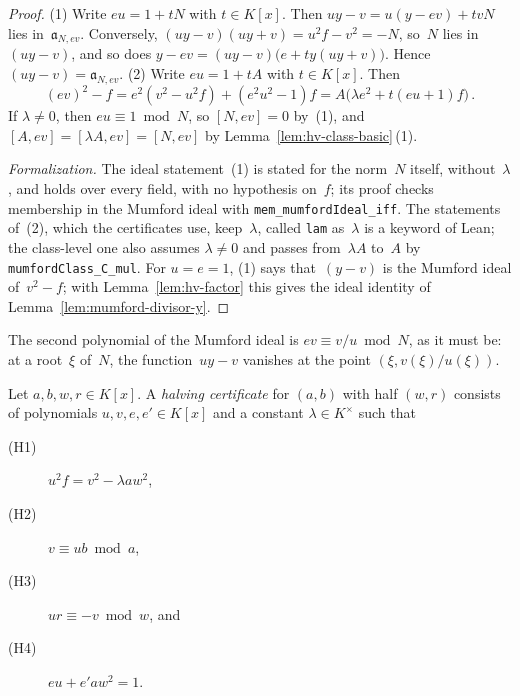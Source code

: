 \begin{proof}
\leanok
{}
(1) Write $eu = 1 + tN$ with $t \in K[x]$. Then $uy - v = u (y - ev) + tvN$ lies
in~$\mathfrak a_{N, ev}$. Conversely, $(uy - v)(uy + v) = u^2 f - v^2 = -N$, so~$N$ lies
in~$(uy - v)$, and so does $y - ev = (uy - v)\bigl(e + ty(uy + v)\bigr)$. Hence
$(uy - v) = \mathfrak a_{N, ev}$.
(2) Write $eu = 1 + tA$ with $t \in K[x]$. Then
\[ (ev)^2 - f = e^2 (v^2 - u^2 f) + (e^2 u^2 - 1) f
               = A\bigl(\lambda e^2 + t (eu + 1) f\bigr)\,. \]
If $\lambda \ne 0$, then $eu \equiv 1 \bmod N$, so $[N, ev] = 0$ by~(1), and
$[A, ev] = [\lambda A, ev] = [N, ev]$ by Lemma~\ref{lem:hv-class-basic}\,(1).

\emph{Formalization.} The ideal statement~(1) is stated for the norm~$N$ itself,
without~$\lambda$, and holds over every field, with no hypothesis on~$f$; its proof checks
membership in the Mumford ideal with \texttt{mem\_mumfordIdeal\_iff}. The statements of~(2), which
the certificates use, keep~$\lambda$, called \texttt{lam} as~$\lambda$ is a keyword of Lean; the
class-level one also assumes $\lambda \ne 0$ and passes from~$\lambda A$ to~$A$ by
\texttt{mumfordClass\_C\_mul}. For $u = e = 1$, (1) says that~$(y - v)$ is the Mumford ideal
of~$v^2 - f$; with Lemma~\ref{lem:hv-factor} this gives the ideal identity of
Lemma~\ref{lem:mumford-divisor-y}.
\end{proof}

The second polynomial of the Mumford ideal is $ev \equiv v/u \bmod N$, as it must be: at a
root~$\xi$ of~$N$, the function~$uy - v$ vanishes at the point $(\xi, v(\xi)/u(\xi))$.

\begin{definition}
\label{def:hv-cert}
\leanok
Let $a, b, w, r \in K[x]$. A \emph{halving certificate} for $(a, b)$ with half $(w, r)$ consists
of polynomials $u, v, e, e' \in K[x]$ and a constant $\lambda \in K^\times$ such that
\begin{description}
  \item[\textmd{(H1)}] $u^2 f = v^2 - \lambda a w^2$,
  \item[\textmd{(H2)}] $v \equiv ub \bmod a$,
  \item[\textmd{(H3)}] $ur \equiv -v \bmod w$, and
  \item[\textmd{(H4)}] $eu + e' a w^2 = 1$.
\end{description}
\end{definition}

